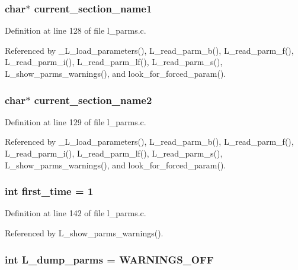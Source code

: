 \subsubsection{\setlength{\rightskip}{0pt plus 5cm}char$\ast$ \bf{current\_\-section\_\-name1}}\label{l__parms_8c_64158f38584b29f5a0cfcecd40f8ac89}




Definition at line 128 of file l\_\-parms.c.

Referenced by \_\-L\_\-load\_\-parameters(), L\_\-read\_\-parm\_\-b(), L\_\-read\_\-parm\_\-f(), L\_\-read\_\-parm\_\-i(), L\_\-read\_\-parm\_\-lf(), L\_\-read\_\-parm\_\-s(), L\_\-show\_\-parms\_\-warnings(), and look\_\-for\_\-forced\_\-param().
\subsubsection{\setlength{\rightskip}{0pt plus 5cm}char$\ast$ \bf{current\_\-section\_\-name2}}\label{l__parms_8c_f4165fc0be67b713ba10168fa0fb8698}




Definition at line 129 of file l\_\-parms.c.

Referenced by \_\-L\_\-load\_\-parameters(), L\_\-read\_\-parm\_\-b(), L\_\-read\_\-parm\_\-f(), L\_\-read\_\-parm\_\-i(), L\_\-read\_\-parm\_\-lf(), L\_\-read\_\-parm\_\-s(), L\_\-show\_\-parms\_\-warnings(), and look\_\-for\_\-forced\_\-param().
\subsubsection{\setlength{\rightskip}{0pt plus 5cm}int \bf{first\_\-time} = 1\hspace{0.3cm}{\tt  [static]}}\label{l__parms_8c_2251ba55279aef307357d4b82d7cffb7}




Definition at line 142 of file l\_\-parms.c.

Referenced by L\_\-show\_\-parms\_\-warnings().
\subsubsection{\setlength{\rightskip}{0pt plus 5cm}int \bf{L\_\-dump\_\-parms} = WARNINGS\_\-OFF}\label{l__parms_8c_d8b6ae8bcbc9ccc867100dfd96f6957c}




